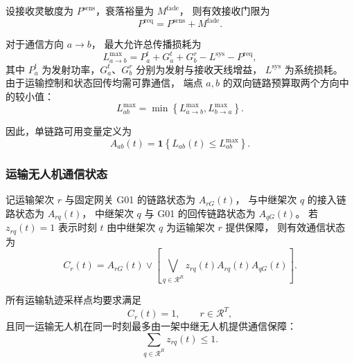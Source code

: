 设接收灵敏度为 $P^{\mathrm{sens}}$，衰落裕量为 $M^{\mathrm{fade}}$，
则有效接收门限为
\begin{equation}
P^{\mathrm{req}}
=P^{\mathrm{sens}}+M^{\mathrm{fade}}.
\label{eq:q3-receive-threshold}
\end{equation}

对于通信方向 $a\rightarrow b$，
最大允许总传播损耗为
\begin{equation}
L_{a\rightarrow b}^{\max}
=P_a^{t}+G_a^{t}+G_b^{r}
-L^{\mathrm{sys}}-P^{\mathrm{req}},
\label{eq:q3-oneway-budget}
\end{equation}
其中 $P_a^t$ 为发射功率，$G_a^t$、$G_b^r$ 分别为发射与接收天线增益，
$L^{\mathrm{sys}}$ 为系统损耗。
由于运输控制和状态回传均需可靠通信，
端点 $a,b$ 的双向链路预算取两个方向中的较小值：
\begin{equation}
L_{ab}^{\max}
=\min\left\{
L_{a\rightarrow b}^{\max},
L_{b\rightarrow a}^{\max}
\right\}.
\label{eq:q3-bidirectional-budget}
\end{equation}

因此，单链路可用变量定义为
\begin{equation}
A_{ab}(t)
=\mathbf{1}\left\{
L_{ab}(t)\le L_{ab}^{\max}
\right\}.
\label{eq:q3-link-available}
\end{equation}

\subsubsection{运输无人机通信状态}

记运输架次 $r$ 与固定网关 G01 的链路状态为
$A_{rG}(t)$，
与中继架次 $q$ 的接入链路状态为 $A_{rq}(t)$，
中继架次 $q$ 与 G01 的回传链路状态为 $A_{qG}(t)$。
若 $z_{rq}(t)=1$ 表示时刻 $t$ 由中继架次 $q$ 为运输架次 $r$ 提供保障，
则有效通信状态为
\begin{equation}
C_r(t)
=A_{rG}(t)
\vee
\left[
\bigvee_{q\in\mathcal{R}^{R}}
z_{rq}(t)A_{rq}(t)A_{qG}(t)
\right].
\label{eq:q3-communication-state}
\end{equation}

所有运输轨迹采样点均要求满足
\begin{equation}
C_r(t)=1,
\qquad r\in\mathcal{R}^{T},
\label{eq:q3-continuous-constraint}
\end{equation}
且同一运输无人机在同一时刻最多由一架中继无人机提供通信保障：
\begin{equation}
\sum_{q\in\mathcal{R}^{R}}z_{rq}(t)\le 1.
\label{eq:q3-one-relay}
\end{equation}

